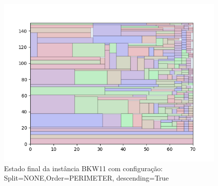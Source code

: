 \begin{figure}[H]
    \centering
    \caption[]{Estado final da instância BKW11 com configuração: Split=NONE,Order=PERIMETER, descending=True}
    \label{fig:bkw11-none-perimeter-true}
    \includegraphics[scale=0.5]{output/figures/bkw/bkw11/none/perimeter/true/000}
\end{figure}